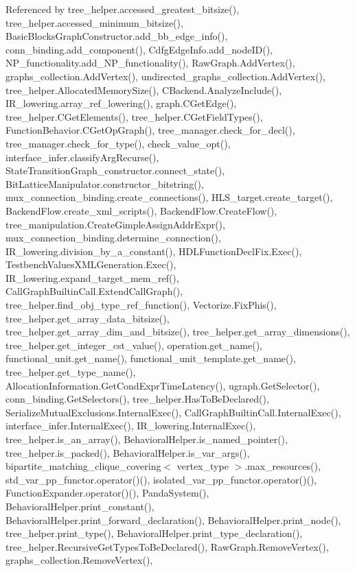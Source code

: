 Referenced by tree\+\_\+helper.\+accessed\+\_\+greatest\+\_\+bitsize(), tree\+\_\+helper.\+accessed\+\_\+minimum\+\_\+bitsize(), Basic\+Blocks\+Graph\+Constructor.\+add\+\_\+bb\+\_\+edge\+\_\+info(), conn\+\_\+binding.\+add\+\_\+component(), Cdfg\+Edge\+Info.\+add\+\_\+node\+I\+D(), N\+P\+\_\+functionality.\+add\+\_\+\+N\+P\+\_\+functionality(), Raw\+Graph.\+Add\+Vertex(), graphs\+\_\+collection.\+Add\+Vertex(), undirected\+\_\+graphs\+\_\+collection.\+Add\+Vertex(), tree\+\_\+helper.\+Allocated\+Memory\+Size(), C\+Backend.\+Analyze\+Include(), I\+R\+\_\+lowering.\+array\+\_\+ref\+\_\+lowering(), graph.\+C\+Get\+Edge(), tree\+\_\+helper.\+C\+Get\+Elements(), tree\+\_\+helper.\+C\+Get\+Field\+Types(), Function\+Behavior.\+C\+Get\+Op\+Graph(), tree\+\_\+manager.\+check\+\_\+for\+\_\+decl(), tree\+\_\+manager.\+check\+\_\+for\+\_\+type(), check\+\_\+value\+\_\+opt(), interface\+\_\+infer.\+classify\+Arg\+Recurse(), State\+Transition\+Graph\+\_\+constructor.\+connect\+\_\+state(), Bit\+Lattice\+Manipulator.\+constructor\+\_\+bitstring(), mux\+\_\+connection\+\_\+binding.\+create\+\_\+connections(), H\+L\+S\+\_\+target.\+create\+\_\+target(), Backend\+Flow.\+create\+\_\+xml\+\_\+scripts(), Backend\+Flow.\+Create\+Flow(), tree\+\_\+manipulation.\+Create\+Gimple\+Assign\+Addr\+Expr(), mux\+\_\+connection\+\_\+binding.\+determine\+\_\+connection(), I\+R\+\_\+lowering.\+division\+\_\+by\+\_\+a\+\_\+constant(), H\+D\+L\+Function\+Decl\+Fix.\+Exec(), Testbench\+Values\+X\+M\+L\+Generation.\+Exec(), I\+R\+\_\+lowering.\+expand\+\_\+target\+\_\+mem\+\_\+ref(), Call\+Graph\+Builtin\+Call.\+Extend\+Call\+Graph(), tree\+\_\+helper.\+find\+\_\+obj\+\_\+type\+\_\+ref\+\_\+function(), Vectorize.\+Fix\+Phis(), tree\+\_\+helper.\+get\+\_\+array\+\_\+data\+\_\+bitsize(), tree\+\_\+helper.\+get\+\_\+array\+\_\+dim\+\_\+and\+\_\+bitsize(), tree\+\_\+helper.\+get\+\_\+array\+\_\+dimensions(), tree\+\_\+helper.\+get\+\_\+integer\+\_\+cst\+\_\+value(), operation.\+get\+\_\+name(), functional\+\_\+unit.\+get\+\_\+name(), functional\+\_\+unit\+\_\+template.\+get\+\_\+name(), tree\+\_\+helper.\+get\+\_\+type\+\_\+name(), Allocation\+Information.\+Get\+Cond\+Expr\+Time\+Latency(), ugraph.\+Get\+Selector(), conn\+\_\+binding.\+Get\+Selectors(), tree\+\_\+helper.\+Has\+To\+Be\+Declared(), Serialize\+Mutual\+Exclusions.\+Internal\+Exec(), Call\+Graph\+Builtin\+Call.\+Internal\+Exec(), interface\+\_\+infer.\+Internal\+Exec(), I\+R\+\_\+lowering.\+Internal\+Exec(), tree\+\_\+helper.\+is\+\_\+an\+\_\+array(), Behavioral\+Helper.\+is\+\_\+named\+\_\+pointer(), tree\+\_\+helper.\+is\+\_\+packed(), Behavioral\+Helper.\+is\+\_\+var\+\_\+args(), bipartite\+\_\+matching\+\_\+clique\+\_\+covering$<$ vertex\+\_\+type $>$.\+max\+\_\+resources(), std\+\_\+var\+\_\+pp\+\_\+functor.\+operator()(), isolated\+\_\+var\+\_\+pp\+\_\+functor.\+operator()(), Function\+Expander.\+operator()(), Panda\+System(), Behavioral\+Helper.\+print\+\_\+constant(), Behavioral\+Helper.\+print\+\_\+forward\+\_\+declaration(), Behavioral\+Helper.\+print\+\_\+node(), tree\+\_\+helper.\+print\+\_\+type(), Behavioral\+Helper.\+print\+\_\+type\+\_\+declaration(), tree\+\_\+helper.\+Recursive\+Get\+Types\+To\+Be\+Declared(), Raw\+Graph.\+Remove\+Vertex(), graphs\+\_\+collection.\+Remove\+Vertex(), 